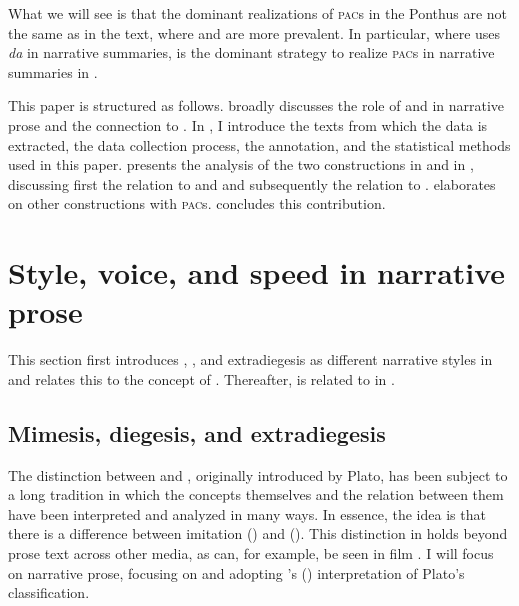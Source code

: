 \documentclass[output=paper,colorlinks,citecolor=brown]{langscibook}
\begin{document}
\noindent What we will see is that the dominant realizations of \textsc{pac}s in the  Ponthus are not the same as in the  text, where  and  are more prevalent. In particular, where  uses \textit{da} in narrative summaries,  is the dominant strategy to realize \textsc{pac}s in narrative summaries in . 

This paper is structured as follows.  broadly discusses the role of  and  in narrative prose and the connection to . In , I introduce the texts from which the data is extracted, the data collection process, the annotation, and the statistical methods used in this paper.  presents the analysis of the two  constructions in  and in , discussing first the relation to  and  and subsequently the relation to .  elaborates on other constructions with \textsc{pac}s.  concludes this contribution.

\section{Style, voice, and speed in narrative prose}\label{sec:2}
This section first introduces , , and extradiegesis as different narrative styles in  and relates this to the concept of . Thereafter,  is related to  in .

\subsection{Mimesis, diegesis, and extradiegesis}\label{sec:2.1}
The distinction between  and , originally introduced by Plato, has been subject to a long tradition in which the concepts themselves and the relation between them have been interpreted and analyzed in many ways. In essence, the idea is that there is a difference between imitation () and  (). This distinction in  holds beyond prose text across other media, as can, for example, be seen in film \citep{Chatman1978}. I will focus on narrative prose, focusing on and adopting \citeauthor{Jong2004}'s (\citeyear{Jong2004}) interpretation of Plato's classification.
\end{document}
